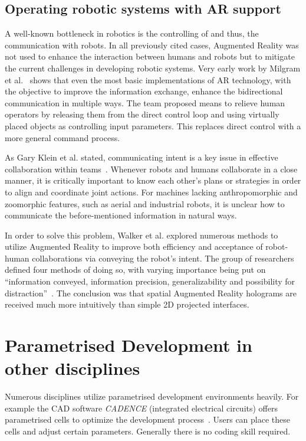 \subsection{Operating robotic systems with AR support}
A well-known bottleneck in robotics is the controlling of and thus, the communication with robots. In all previously cited cases, Augmented Reality was not used to enhance the interaction between humans and robots but to mitigate the current challenges in developing robotic systems. Very early work by Milgram et al.~\cite{milgram1993applications} shows that even the most basic implementations of AR technology, with the objective to improve the information exchange, enhance the bidirectional communication in multiple ways. The team proposed means to relieve human operators by releasing them from the direct control loop and using virtually placed objects as controlling input parameters. This replaces direct control with a more general command process.

As Gary Klein et al. stated, communicating intent is a key issue in effective collaboration within teams~\cite{klein2005common}. Whenever robots and humans collaborate in a close manner, it is critically important to know each other’s plans or strategies in order to align and coordinate joint actions. For machines lacking anthropomorphic and zoomorphic features, such as aerial and industrial robots, it is unclear how to communicate the before-mentioned information in natural ways.

In order to solve this problem, Walker et al. \cite{walker2018communicating} explored numerous methods to utilize Augmented Reality to improve both efficiency and acceptance of robot-human collaborations via conveying the robot's intent. The group of researchers defined four methods of doing so, with varying importance being put on “information conveyed, information precision, generalizability and possibility for distraction”~\cite{walker2018communicating}. The conclusion was that spatial Augmented Reality holograms are received much more intuitively than simple 2D projected interfaces.

\section{Parametrised Development in other disciplines}\label{Section:ParametricDesignIntoduction}
Numerous disciplines utilize parametrised development environments heavily. For example the CAD software \textit{CADENCE} (integrated electrical circuits) offers parametrised cells to optimize the development process~\cite{parametrizedCellElectricalInductor}. Users can place these cells and adjust certain parameters. Generally there is no coding skill required.

